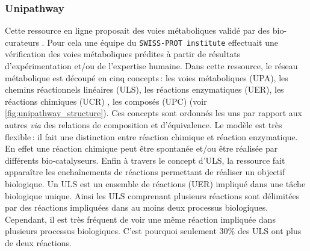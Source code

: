 \begin{refsegment}
    \subsubsection{Unipathway}
    
    Cette ressource en ligne proposait des voies métaboliques validé par des bio-curateurs \cite{morgat2011unipathway}. Pour cela une équipe du \texttt{SWISS-PROT institute} effectuait une vérification des voies métaboliques prédites à partir de résultats d'expérimentation et/ou de l'expertise humaine. Dans cette ressource, le réseau métabolique est découpé en cinq concepts : les voies métaboliques (\acrfull{UPA}), les chemins réactionnels linéaires (\acrfull{ULS}), les réactions enzymatiques (\acrfull{UER}), les réactions chimiques (\acrfull{UCR}) , les composés (\acrfull{UPC}) (voir \cref{fig:unipathway_structure}). Ces concepts sont ordonnés les uns par rapport aux autres \textit{via} des relations de composition et d'équivalence. Le modèle est très flexible : il fait une distinction entre réaction chimique et réaction enzymatique. En effet une réaction chimique peut être spontanée et/ou être réalisée par différents bio-catalyseurs. Enfin à travers le concept d'\acrfull{ULS}, la ressource fait apparaître les enchaînements de réactions permettant de réaliser un objectif biologique. Un \acrfull{ULS} est un ensemble de réactions (\acrfull{UER}) impliqué dans une  tâche biologique unique. Ainsi les \acrfull{ULS} comprenant plusieurs réactions sont délimitées par des réactions impliquées dans au moins deux processus biologiques. Cependant, il est très fréquent de voir une même réaction impliquée dans plusieurs processus biologiques. C'est pourquoi seulement 30\% des \acrfull{ULS} ont plus de deux réactions.
    

\end{refsegment}

